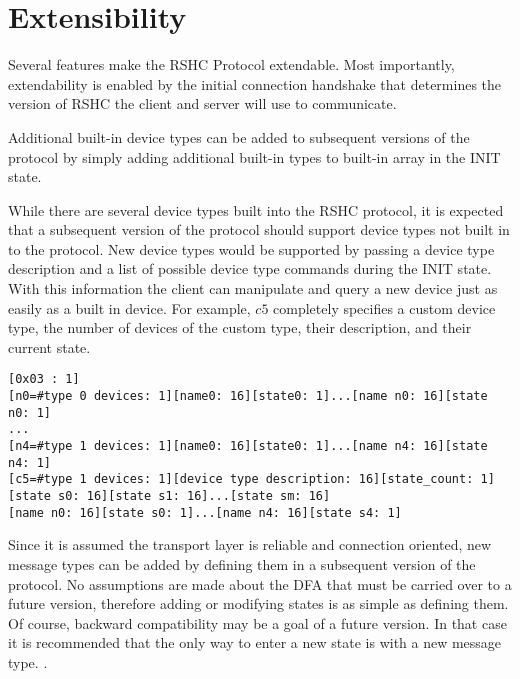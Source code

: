 \section{Extensibility}
\label{sec:extend}

Several features make the RSHC Protocol extendable.  Most importantly, extendability is enabled by the initial connection handshake that determines the version of RSHC the client and server will use to communicate.

Additional built-in device types can be added to subsequent versions of the protocol by simply adding additional built-in types to built-in array in the INIT state.  

While there are several device types built into the RSHC protocol, it is expected that a subsequent version of the protocol should support device types not built in to the protocol.  New device types would be supported by passing a device type description and a list of possible device type commands during the INIT state.  With this information the client can manipulate and query a new device just as easily as a built in device.  For example, $c5$ completely specifies a custom device type, the number of devices of the custom type, their description, and their current state.

\begin{verbatim}
[0x03 : 1]
[n0=#type 0 devices: 1][name0: 16][state0: 1]...[name n0: 16][state n0: 1]
...
[n4=#type 1 devices: 1][name0: 16][state0: 1]...[name n4: 16][state n4: 1]
[c5=#type 1 devices: 1][device type description: 16][state_count: 1]
[state s0: 16][state s1: 16]...[state sm: 16]
[name n0: 16][state s0: 1]...[name n4: 16][state s4: 1]
\end{verbatim}

Since it is assumed the transport layer is reliable and connection oriented, new message types can be added by defining them in a subsequent version of the protocol.  No assumptions are made about the DFA that must be carried over to a future version, therefore adding or modifying states is as simple as defining them.  Of course, backward compatibility may be a goal of a future version.  In that case it is recommended that the only way to enter a new state is with a new message type.
.  



